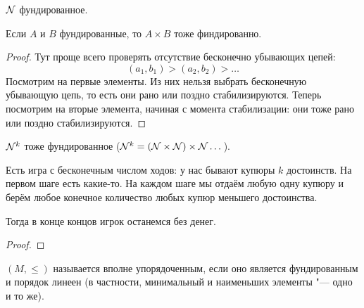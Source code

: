 \begin{exmp}\label{well_founded_no}
	$\mathcal{N}$ фундированное.
\end{exmp}
\begin{exmp}
	Если $A$ и $B$ фундированные, то $A \times B$ тоже финдированно.
\end{exmp}
\begin{proof}
	Тут проще всего проверять отсутствие бесконечно убывающих цепей:
	\[ (a_1, b_1) > (a_2, b_2) > \dots \]
	Посмотрим на первые элементы.
	Из них нельзя выбрать бесконечную убывающую цепь, то есть они рано или поздно стабилизируются.
	Теперь посмотрим на вторые элемента, начиная с момента стабилизации: они тоже рано или поздно
	стабилизируются.
\end{proof}
\begin{exmp}
	$\mathcal{N}^k$ тоже фундированное ($\mathcal{N}^k=(\mathcal{N}\times\mathcal{N})\times\mathcal{N}\dots$).
\end{exmp}
\begin{exmp}
	Есть игра с бесконечным числом ходов: у нас бывают купюры $k$ достоинств.
	На первом шаге есть какие-то.
	На каждом шаге мы отдаём любую одну купюру и берём любое конечное количество
	любых купюр меньшего достоинства.

	Тогда в конце концов игрок останемся без денег.
\end{exmp}
\begin{proof}
\end{proof}

\begin{Def}
	$(M, \le)$ называется вполне упорядоченным, если оно является фундированным и
	порядок линеен (в частности, минимальный и наименьших элементы "--- одно и то же).
\end{Def}

